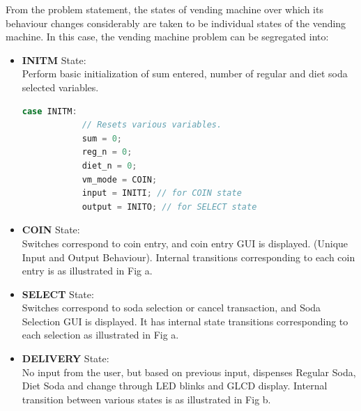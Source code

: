\documentclass[a4paper,12pt,oneside]{book}
\begin{document}
\qquad From the problem statement, the states of vending machine over which its behaviour changes considerably are taken to be individual states of the vending machine. In this case, the vending machine problem can be segregated into:
\begin{itemize}
  \item \textbf{{\small INITM}} State: \\ \qquad \qquad Perform basic initialization of sum entered, number of regular and diet soda selected variables.
  \begin{lstlisting}[basicstyle = \small, language = C]
          case INITM:
            // Resets various variables.
            sum = 0;
            reg_n = 0;
            diet_n = 0;
            vm_mode = COIN;
            input = INITI; // for COIN state
            output = INITO; // for SELECT state
  \end{lstlisting}
  \item \textbf{{\small COIN}} State: \\ \qquad \qquad Switches correspond to coin entry, and coin entry GUI is displayed. (Unique Input and Output Behaviour). Internal transitions corresponding to each coin entry is as illustrated in Fig a.
  \item \textbf{{\small SELECT}} State: \\ \qquad \qquad Switches correspond to soda selection or cancel transaction, and Soda Selection GUI is displayed. It has internal state transitions corresponding to each selection as illustrated in Fig a.
  \item \textbf{{\small DELIVERY}} State: \\ \qquad \qquad No input from the user, but based on previous input, dispenses Regular Soda, Diet Soda and change through LED blinks and GLCD display. Internal transition between various states is as illustrated in Fig b.
\end{itemize}
\end{document}
